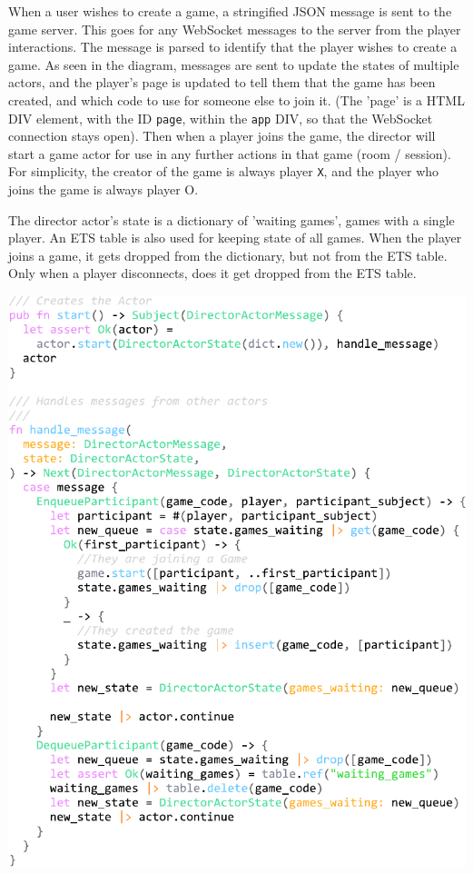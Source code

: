 \documentclass[]{final}
\begin{document}
When a user wishes to create a game, a stringified JSON message is sent to the game server.
This goes for any WebSocket messages to the server from the player interactions.
The message is parsed to identify that the player wishes to create a game. As seen in the diagram,
messages are sent to update the states of multiple actors, and the player's page is updated to tell
them that the game has been created, and which code to use for someone else to join it.
(The 'page' is a HTML DIV element, with the ID \lstinline|page|, within the \lstinline|app| DIV, so that the WebSocket
connection stays open). Then when a player joins the game, the director will start
a game actor for use in any further actions in that game (room / session). For simplicity,
the creator of the game is always player \lstinline|X|, and the player who joins the game is always player O.
\begin{minipage}[t]{18em}

  The director actor's state is a dictionary of 'waiting games',
  games with a single player. An ETS table is also used for keeping
  state of all games. When the player joins a game, it gets dropped
  from the dictionary, but not from the ETS table. Only when a player
  disconnects, does it get dropped from the ETS table.

\end{minipage}
\hfill
\begin{minipage}[t]{20em}
  \includegraphics[width=\textwidth]{director_actor.pdf}
  \label{fig: 6}
\end{minipage}
\end{document}
